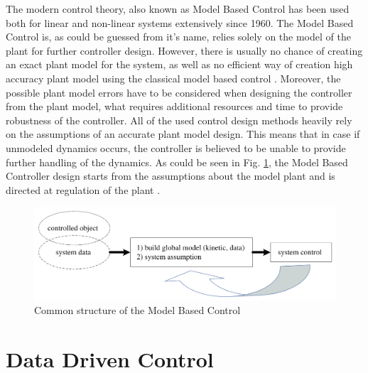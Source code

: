 \documentclass[]{final_report}
\begin{document}
The modern control theory, also known as Model Based Control has been used both for linear and non-linear systems extensively since 1960. The Model Based Control is, as could be guessed from it's name, relies solely on the model of the plant for further controller design. However, there is usually no chance of creating an exact plant model for the system, as well as no efficient way of creation high accuracy plant model using the classical model based control \cite{hou2013model}. Moreover, the possible plant model errors have to be considered when designing the controller from the plant model, what requires additional resources and time to provide robustness of the controller. All of the used control design methods heavily rely on the assumptions of an accurate plant model design. This means that in case if unmodeled dynamics occurs, the controller is believed to be unable to provide further handling of the dynamics. As could be seen in Fig. \ref{fig:mbcsctruct}, the Model Based Controller design starts from the assumptions about the model plant and is directed at regulation of the plant \cite{hou2013model}.

\begin{figure} [h!]
\centerline{\includegraphics[width=.65\textwidth]{Screenshots for paper/1.png}}
\caption{Common structure of the Model Based Control \cite{hou2013model}}
\label{fig:mbcsctruct}
\end{figure}

\section{Data Driven Control}
\end{document}
